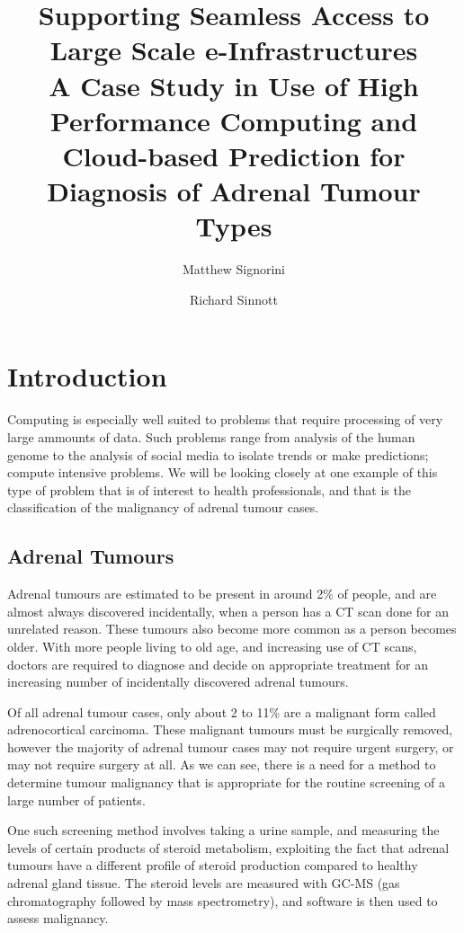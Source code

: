 \documentclass[a4paper]{article}
\title{Supporting Seamless Access to Large Scale e-Infrastructures\\ 
    \large A Case
    Study in Use of High Performance Computing and Cloud-based Prediction
    for Diagnosis of Adrenal Tumour Types}
\author{Matthew Signorini \and Richard Sinnott}
\begin{document}
\begin{titlepage}
    \maketitle

    \begin{abstract}
        \blindtext
    \end{abstract}

    \tableofcontents
\end{titlepage}


\section{Introduction}

Computing is especially well suited to problems that require processing
of very large ammounts of data. Such problems range from analysis of the
human genome to the analysis of social media to isolate trends or make 
predictions; compute intensive problems. We will be looking closely at one 
example of this type of problem that is of interest to health 
professionals, and that is the classification
of the malignancy of adrenal tumour cases.

\subsection{Adrenal Tumours}
Adrenal tumours are estimated to be present in around 2\% of people, and
are almost always discovered incidentally, when a person has a CT scan
done for an unrelated reason. These tumours also become more common as a
person becomes older. With more people living to old age, and increasing
use of CT scans, doctors are required to diagnose and decide on appropriate
treatment for an increasing number of incidentally discovered adrenal
tumours. 

Of all adrenal tumour cases, only about 2 to 11\% are a malignant form
called adrenocortical carcinoma. These malignant tumours must be surgically
removed, however the majority of adrenal tumour cases may not require
urgent surgery, or may not require surgery at all. As we can see, there
is a need for a method to determine tumour malignancy that is appropriate
for the routine screening of a large number of patients.

One such screening method involves taking a urine sample, and measuring
the levels of certain products of steroid metabolism, exploiting the fact
that adrenal tumours have a different profile of steroid production
compared to healthy adrenal gland tissue. The steroid levels are measured
with GC-MS (gas chromatography followed by mass spectrometry), and
software is then used to assess malignancy.
\end{document}
